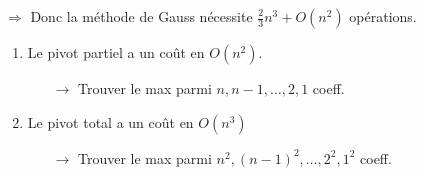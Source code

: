 $\Rightarrow$ Donc la méthode de Gauss nécessite $\frac{2}{3}n^3+O(n^2)$ opérations.

\vspace{0.5cm}
\begin{remark}
    \begin{enumerate}
        \item Le pivot partiel a un coût en $O(n^2)$.
            \begin{itemize}
                \item [$\rightarrow$] Trouver le max parmi $n,n-1, \dots, 2, 1$ coeff.
            \end{itemize}

        \item Le pivot total a un coût en $O(n^3)$
            \begin{itemize}
                \item [$\rightarrow$] Trouver le max parmi $n^2, (n-1)^2, \dots , 2^2, 1^2$ coeff.
            \end{itemize}
    \end{enumerate}
\end{remark}





